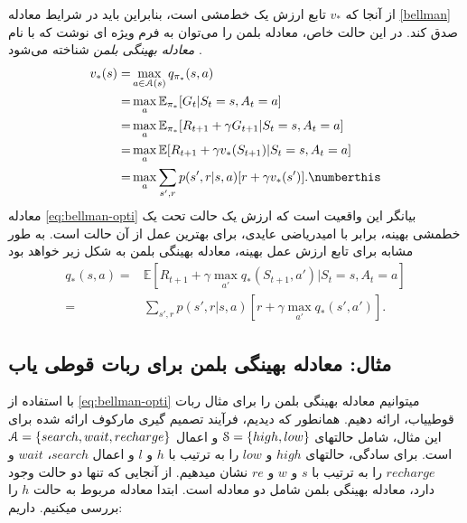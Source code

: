 از آنجا که $v_*$ تابع ارزش یک خط‌مشی است، بنابراین باید در شرایط معادله \ref{bellman} صدق کند.
در این حالت خاص، معادله بلمن را می‌توان به فرم ویژه ای نوشت که با نام
 \textit{معادله بهینگی بلمن}
شناخته می‌شود \cite{suttonbook}.
\begin{align}
  v_{*}(s)= &\max_{a \in \EuScript{A}(s)} q_{\pi_*}(s,a) \nonumber \\
      =& \max_{a} \mathbb{E}_{\pi_*} [G_t|S_t=s, A_t=a] \nonumber \\ 
      =& \max_{a} \mathbb{E}_{\pi_*} [R_{t+1} + \gamma G_{t+1} | S_t=s, A_t=a] \nonumber \\ 
      =& \max_{a} \mathbb{E} [R_{t+1} + \gamma v_*(S_{t+1}) | S_t= s, A_t = a] \nonumber \\
      =& \max_{a} \sum_{s',r} p(s',r|s,a) [r + \gamma v_*(s')]. \numberthis
\label{eq:bellman-opti}
\end{align}
معادله 
\ref{eq:bellman-opti}
 بیانگر این واقعیت است که ارزش یک حالت تحت یک خط\nf مشی بهینه، برابر با امیدریاضی عایدی، برای بهترین عمل از آن حالت است. به طور مشابه برای تابع ارزش عمل بهینه، معادله بهینگی بلمن به شکل زیر خواهد بود \cite{suttonbook}
\begin{align}
q_*(s,a) =& \mathbb{E}\left[R_{t+1} + \gamma \max_{a'} q_*(S_{t+1},a')| S_t=s, A_t=a \right] \nonumber\\
=& \sum_{s',r} p(s',r|s,a) \left[r + \gamma \max_{a'} q_*(s',a')\right] 
\label{eq:2}.
\end{align}

\subsection{مثال: معادله بهینگی بلمن برای ربات قوطی یاب \cite{suttonbook}}
با استفاده از 
\ref{eq:bellman-opti}
می\nf توانیم معادله بهینگی بلمن را برای مثال ربات قوطی\nf یاب، ارائه دهیم. همانطور که دیدیم، فرآیند تصمیم گیری مارکوف ارائه شده برای این مثال، شامل حالت\nf های 
$\EuScript{S} = \{high, low\}$
و اعمال 
$\EuScript{A} = \{search, wait, recharge\}$
است.
برای سادگی، حالت\nf های $high$ و $low$ را به ترتیب با $h$ و $l$ و اعمال $search$،
$wait$
و
$recharge$
را به ترتیب با $s$ و $w$ و $re$ نشان می\nf دهیم. از آنجایی که تنها دو حالت وجود دارد، معادله بهینگی بلمن شامل دو معادله است. ابتدا معادله مربوط به حالت $h$ را بررسی می\nf کنیم. داریم:


